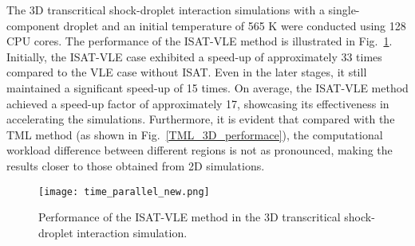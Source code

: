 The 3D transcritical shock-droplet interaction simulations with a single-component droplet and an initial temperature of 565 K were conducted using 128 CPU cores. The performance of the ISAT-VLE method is illustrated in Fig.~\ref{droplet_3D_perf}. Initially, the ISAT-VLE case exhibited a speed-up of approximately 33 times compared to the VLE case without ISAT. Even in the later stages, it still maintained a significant speed-up of 15 times. On average, the ISAT-VLE method achieved a speed-up factor of approximately 17, showcasing its effectiveness in accelerating the simulations. Furthermore, it is evident that compared with the TML method (as shown in Fig.~\ref{TML_3D_performace}), the computational workload difference between different regions is not as pronounced, making the results closer to those obtained from 2D simulations.


 

\begin{figure}[htbp]
\centering
\texttt{[image: time\_parallel\_new.png]}
\caption{Performance of the ISAT-VLE method in the 3D transcritical shock-droplet interaction simulation.}
\label{droplet_3D_perf} 
\end{figure}



